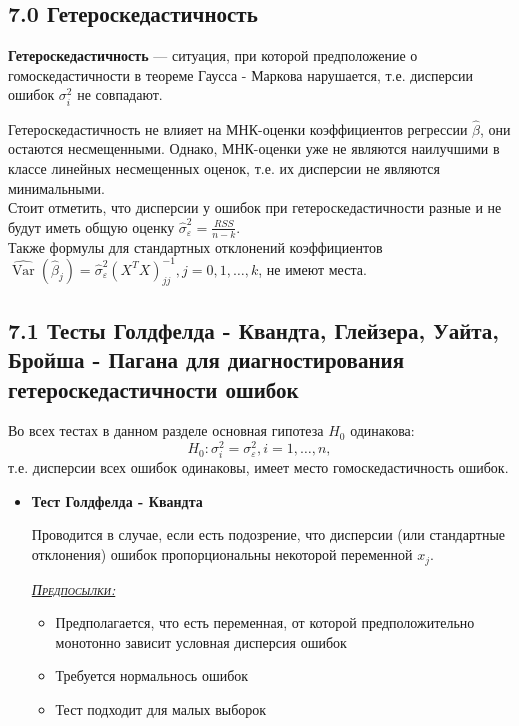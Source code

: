 \documentclass[a0,final]{a0poster}
\DeclareMathOperator{\Var}{Var}
\begin{document}
\begin{multicols}{4}
\section*{7.0 Гетероскедастичность}
\begin{tcolorbox}[colback=red!5!white,colframe=red!75!black]
\textbf{Гетероскедастичность} — ситуация, при которой предположение о гомоскедастичности в теореме Гаусса - Маркова нарушается, т.е. дисперсии ошибок $\sigma^2_i$ не совпадают.
\end{tcolorbox}
Гетероскедастичность не влияет на МНК-оценки коэффициентов регрессии $\hat{\beta}$, они остаются несмещенными. Однако, МНК-оценки уже не являются наилучшими в классе линейных несмещенных оценок, т.е. их дисперсии не являются минимальными. \\
Стоит отметить, что дисперсии у ошибок при гетероскедастичности разные и не будут иметь общую оценку $\hat{\sigma}^2_\varepsilon = \frac{RSS}{n-k}$. \\
Также формулы для стандартных отклонений коэффициентов $\hat{\Var}(\hat{\beta}_j) = \hat{\sigma}^2_\varepsilon(X^TX)^{-1}_{jj}, j = 0, 1, \ldots, k$, не имеют места.
\subsection*{7.1 Тесты Голдфелда - Квандта, Глейзера, Уайта, Бройша - Пагана для диагностирования гетероскедастичности ошибок}
Во всех тестах в данном разделе основная гипотеза $H_0$ одинакова: \[H_0: \sigma^2_i = \sigma^2_\varepsilon,  i = 1, \ldots, n,\] т.е. дисперсии всех ошибок одинаковы, имеет место гомоскедастичность ошибок.

\begin{itemize}
\item \textbf{Тест Голдфелда - Квандта}

Проводится в случае, если есть подозрение, что дисперсии (или стандартные отклонения) ошибок пропорциональны некоторой переменной $x_j$.

\underline{\textsc{\textit{Предпосылки:}}}
\begin{itemize}
\item Предполагается, что есть переменная, от которой предположительно монотонно зависит условная дисперсия ошибок
\item Требуется нормальнось ошибок
\item Тест подходит для малых выборок
\end{itemize}


\end{itemize}
\end{multicols}
\end{document}
